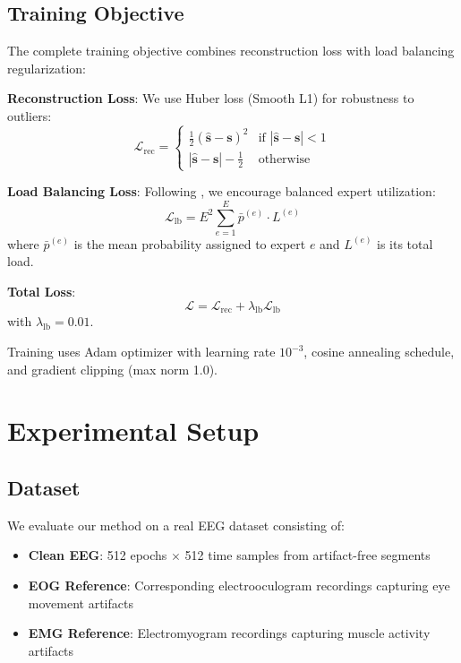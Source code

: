 \documentclass[journal]{IEEEtran}
\begin{document}
\subsection{Training Objective}

The complete training objective combines reconstruction loss with load balancing regularization:

\textbf{Reconstruction Loss}: We use Huber loss (Smooth L1) for robustness to outliers:
\begin{equation}
\mathcal{L}_{\text{rec}} = \begin{cases}
\frac{1}{2}(\hat{\mathbf{s}} - \mathbf{s})^2 & \text{if } |\hat{\mathbf{s}} - \mathbf{s}| < 1\\
|\hat{\mathbf{s}} - \mathbf{s}| - \frac{1}{2} & \text{otherwise}
\end{cases}
\end{equation}

\textbf{Load Balancing Loss}: Following \cite{fedus2022switch}, we encourage balanced expert utilization:
\begin{equation}
\mathcal{L}_{\text{lb}} = E^2 \sum_{e=1}^{E} \bar{p}^{(e)} \cdot L^{(e)}
\end{equation}
where $\bar{p}^{(e)}$ is the mean probability assigned to expert $e$ and $L^{(e)}$ is its total load.

\textbf{Total Loss}:
\begin{equation}
\mathcal{L} = \mathcal{L}_{\text{rec}} + \lambda_{\text{lb}} \mathcal{L}_{\text{lb}}
\end{equation}
with $\lambda_{\text{lb}} = 0.01$.

Training uses Adam optimizer \cite{kingma2014adam} with learning rate $10^{-3}$, cosine annealing schedule, and gradient clipping (max norm 1.0).

\section{Experimental Setup}
\label{sec:experiments}

\subsection{Dataset}

We evaluate our method on a real EEG dataset consisting of:
\begin{itemize}
\item \textbf{Clean EEG}: 512 epochs $\times$ 512 time samples from artifact-free segments
\item \textbf{EOG Reference}: Corresponding electrooculogram recordings capturing eye movement artifacts
\item \textbf{EMG Reference}: Electromyogram recordings capturing muscle activity artifacts
\end{itemize}
\end{document}
